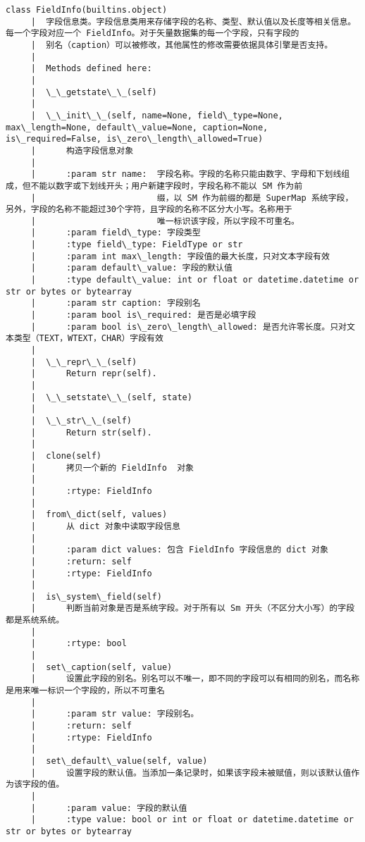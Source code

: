 \documentclass[11pt]{article}
\begin{document}
\begin{Verbatim}[commandchars=\\\{\}]
    class FieldInfo(builtins.object)
     |  字段信息类。字段信息类用来存储字段的名称、类型、默认值以及长度等相关信息。 每一个字段对应一个 FieldInfo。对于矢量数据集的每一个字段，只有字段的
     |  别名（caption）可以被修改，其他属性的修改需要依据具体引擎是否支持。
     |  
     |  Methods defined here:
     |  
     |  \_\_getstate\_\_(self)
     |  
     |  \_\_init\_\_(self, name=None, field\_type=None, max\_length=None, default\_value=None, caption=None, is\_required=False, is\_zero\_length\_allowed=True)
     |      构造字段信息对象
     |      
     |      :param str name:  字段名称。字段的名称只能由数字、字母和下划线组成，但不能以数字或下划线开头；用户新建字段时，字段名称不能以 SM 作为前
     |                        缀，以 SM 作为前缀的都是 SuperMap 系统字段，另外，字段的名称不能超过30个字符，且字段的名称不区分大小写。名称用于
     |                        唯一标识该字段，所以字段不可重名。
     |      :param field\_type: 字段类型
     |      :type field\_type: FieldType or str
     |      :param int max\_length: 字段值的最大长度，只对文本字段有效
     |      :param default\_value: 字段的默认值
     |      :type default\_value: int or float or datetime.datetime or str or bytes or bytearray
     |      :param str caption: 字段别名
     |      :param bool is\_required: 是否是必填字段
     |      :param bool is\_zero\_length\_allowed: 是否允许零长度。只对文本类型（TEXT，WTEXT，CHAR）字段有效
     |  
     |  \_\_repr\_\_(self)
     |      Return repr(self).
     |  
     |  \_\_setstate\_\_(self, state)
     |  
     |  \_\_str\_\_(self)
     |      Return str(self).
     |  
     |  clone(self)
     |      拷贝一个新的 FieldInfo  对象
     |      
     |      :rtype: FieldInfo
     |  
     |  from\_dict(self, values)
     |      从 dict 对象中读取字段信息
     |      
     |      :param dict values: 包含 FieldInfo 字段信息的 dict 对象
     |      :return: self
     |      :rtype: FieldInfo
     |  
     |  is\_system\_field(self)
     |      判断当前对象是否是系统字段。对于所有以 Sm 开头（不区分大小写）的字段都是系统系统。
     |      
     |      :rtype: bool
     |  
     |  set\_caption(self, value)
     |      设置此字段的别名。别名可以不唯一，即不同的字段可以有相同的别名，而名称是用来唯一标识一个字段的，所以不可重名
     |      
     |      :param str value: 字段别名。
     |      :return: self
     |      :rtype: FieldInfo
     |  
     |  set\_default\_value(self, value)
     |      设置字段的默认值。当添加一条记录时，如果该字段未被赋值，则以该默认值作为该字段的值。
     |      
     |      :param value: 字段的默认值
     |      :type value: bool or int or float or datetime.datetime or str or bytes or bytearray

\end{Verbatim}
\end{document}
